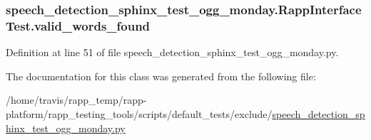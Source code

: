 \hypertarget{classspeech__detection__sphinx__test__ogg__monday_1_1RappInterfaceTest_a4cc4a37f471fb42e382e3bdc66c0a610}{
\subsubsection[{valid\-\_\-words\-\_\-found}]{\setlength{\rightskip}{0pt plus 5cm}speech\-\_\-detection\-\_\-sphinx\-\_\-test\-\_\-ogg\-\_\-monday.\-Rapp\-Interface\-Test.\-valid\-\_\-words\-\_\-found}}\label{classspeech__detection__sphinx__test__ogg__monday_1_1RappInterfaceTest_a4cc4a37f471fb42e382e3bdc66c0a610}


Definition at line 51 of file speech\-\_\-detection\-\_\-sphinx\-\_\-test\-\_\-ogg\-\_\-monday.\-py.



The documentation for this class was generated from the following file\-:\begin{DoxyCompactItemize}
\item 
/home/travis/rapp\-\_\-temp/rapp-\/platform/rapp\-\_\-testing\-\_\-tools/scripts/default\-\_\-tests/exclude/\hyperlink{speech__detection__sphinx__test__ogg__monday_8py}{speech\-\_\-detection\-\_\-sphinx\-\_\-test\-\_\-ogg\-\_\-monday.\-py}\end{DoxyCompactItemize}
